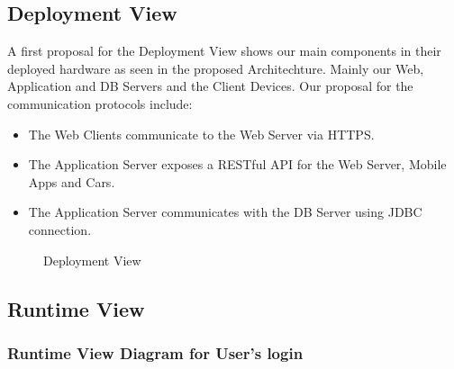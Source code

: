 \documentclass[a4paper]{article}
\begin{document}
\subsection{Deployment View}
A first proposal for the Deployment View shows our main components in their deployed hardware as seen in the proposed Architechture. Mainly our Web, Application and DB Servers and the Client Devices. Our proposal for the communication protocols include:
\begin{itemize} 
\item The Web Clients communicate to the Web Server via HTTPS. 
\item The Application Server exposes a RESTful API for the Web Server, Mobile Apps and Cars. 
\item The Application Server communicates with the DB Server using JDBC connection.
\end{itemize}
\begin{figure}[h]
\centering
\vspace*{\fill}
\noindent{}%
\caption {Deployment View}
\vspace*{0.5cm}
\end{figure}
\newpage
\subsection{Runtime View}
\subsubsection{Runtime View Diagram for User's login}
\begin{figure}[h]
\centering
\vspace*{\fill}
\noindent{}%
\vspace*{0.1cm}
\end{figure}
\newpage
\end{document}
